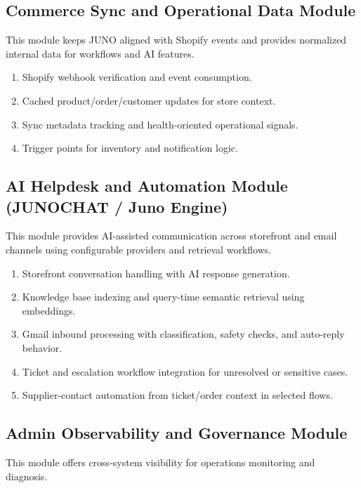 \subsection{Commerce Sync and Operational Data Module}

This module keeps JUNO aligned with Shopify events and provides normalized internal data for workflows and AI features.

\begin{enumerate}
    \item Shopify webhook verification and event consumption.
    \item Cached product/order/customer updates for store context.
    \item Sync metadata tracking and health-oriented operational signals.
    \item Trigger points for inventory and notification logic.
\end{enumerate}

\subsection{AI Helpdesk and Automation Module (JUNOCHAT / Juno Engine)}

This module provides AI-assisted communication across storefront and email channels using configurable providers and retrieval workflows.

\begin{enumerate}
    \item Storefront conversation handling with AI response generation.
    \item Knowledge base indexing and query-time semantic retrieval using embeddings.
    \item Gmail inbound processing with classification, safety checks, and auto-reply behavior.
    \item Ticket and escalation workflow integration for unresolved or sensitive cases.
    \item Supplier-contact automation from ticket/order context in selected flows.
\end{enumerate}

\subsection{Admin Observability and Governance Module}

This module offers cross-system visibility for operations monitoring and diagnosis.

